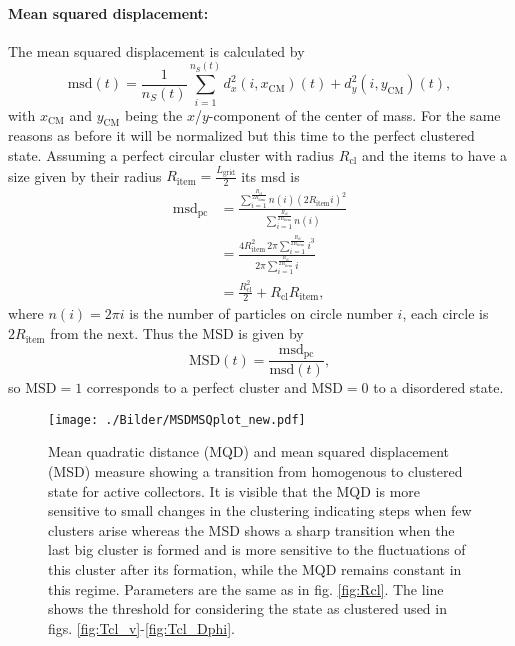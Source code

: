 \paragraph{Mean squared displacement:} The mean squared displacement is calculated by
%
\begin{equation}
	\text{msd}(t) = \frac{1}{n_S(t)}\sum_{i=1}^{n_S(t)}d_x^2(i,x_\text{CM})(t)+d_y^2(i,y_\text{CM})(t),
\label{eq:msd}
\end{equation}
%
with $x_\text{CM}$ and $y_\text{CM}$ being the $x$/$y$-component of the center of mass. For the same reasons as before it will be normalized but this time to the perfect clustered state. Assuming a perfect circular cluster with radius $R_\text{cl}$ and the items to have a size given by their radius $R_\text{item}=\frac{L_\text{grid}}{2}$ its msd is
%
\begin{align}
	\nonumber \text{msd}_\text{pc} &= \frac{\sum_{i=1}^{\frac{R_\text{cl}}{2R_\text{item}}}n(i)\left(2R_\text{item}i\right)^2}{\sum_{i=1}^{\frac{R_\text{cl}}{2R_\text{item}}}n(i)} \\
	\nonumber &= \frac{4R_\text{item}^2\,2\pi\sum_{i=1}^{\frac{R_\text{cl}}{2R_\text{item}}}i^3}{2\pi\sum_{i=1}^{\frac{R_\text{cl}}{2R_\text{item}}}i} \\
	&= \frac{R_\text{cl}^2}{2}+R_\text{cl}R_\text{item},
\label{eq:msdpc}
\end{align}
%
where $n(i)=2\pi i$ is the number of particles on circle number $i$, each circle is $2R_\text{item}$ from the next.
Thus the MSD is given by
%
\begin{equation}
	\text{MSD}(t) = \frac{\text{msd}_\text{pc}}{\text{msd}(t)},
\end{equation}
%
so $\text{MSD}=1$ corresponds to a perfect cluster and $\text{MSD}=0$ to a disordered state.
%
\begin{figure}[H]
\centering
  \texttt{[image: ./Bilder/MSDMSQplot\_new.pdf]}
\caption{
    Mean quadratic distance (MQD) and mean squared displacement (MSD) measure showing a transition from homogenous to clustered state for active collectors.
    It is visible that the MQD is more sensitive to small changes in the clustering indicating steps when few clusters arise whereas the MSD shows a sharp transition when the last big cluster is formed and is more sensitive to the fluctuations of this cluster after its formation, while the MQD remains constant in this regime.
    Parameters are the same as in fig. \ref{fig:Rcl}.
    The line shows the threshold for considering the state as clustered used in figs. \ref{fig:Tcl_v}-\ref{fig:Tcl_Dphi}.
}
\label{fig:MQDMSD}
\end{figure}
%

